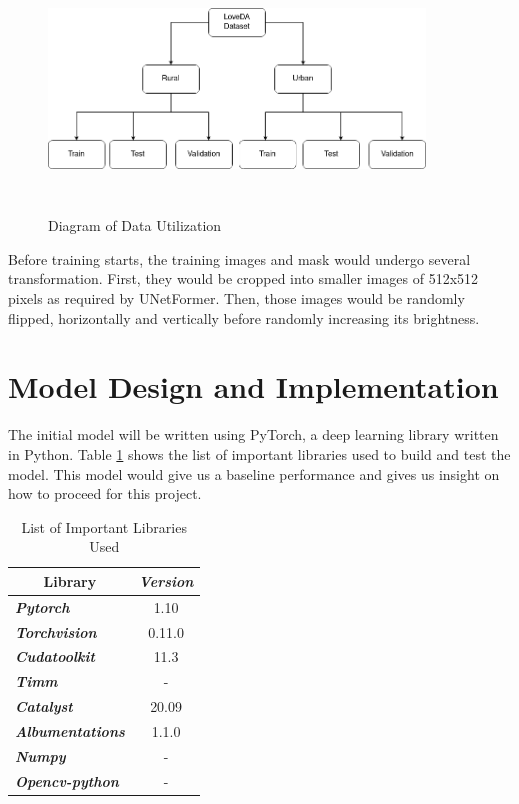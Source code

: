 \FloatBarrier
\begin{figure}[!h]
\includegraphics[width=10.0cm, height=6.5cm]{images/loveda-chart.png}
\centering
\caption{Diagram of Data Utilization}
\label{fig:data-uti}
\end{figure}
\FloatBarrier

Before training starts, the training images and mask would undergo several transformation. First, they would be cropped into smaller images of 512x512 pixels as required by UNetFormer. Then, those images would be randomly flipped, horizontally and vertically before randomly increasing its brightness.



\section{Model Design and Implementation}

The initial model will be written using PyTorch, a deep learning library written in Python. Table \ref{tab:libraries} shows the list of important libraries used to build and test the model. This model would give us a baseline performance and gives us insight on how to proceed for this project.

\begin{table}[]
\centering
\begin{tabular}{|l|c|}
\hline
\multicolumn{1}{|c|}{\textbf{Library}} & \textit{\textbf{Version}} \\ \hline
\textit{\textbf{Pytorch}}              & 1.10                      \\ \hline
\textit{\textbf{Torchvision}}          & 0.11.0                    \\ \hline
\textit{\textbf{Cudatoolkit}}          & 11.3                      \\ \hline
\textit{\textbf{Timm}}                 & -                         \\ \hline
\textit{\textbf{Catalyst}}             & 20.09                     \\ \hline
\textit{\textbf{Albumentations}}       & 1.1.0                     \\ \hline
\textit{\textbf{Numpy}}                & -                         \\ \hline
\textit{\textbf{Opencv-python}}       & -                         \\ \hline
\end{tabular}
\caption{List of Important Libraries Used}
\label{tab:libraries}
\end{table}

